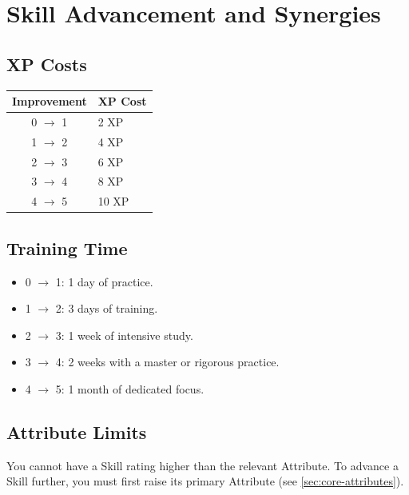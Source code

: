 \section{Skill Advancement and Synergies}
\label{sec:skill-advancement}

\subsection{XP Costs}
\begin{center}
\begin{tabular}{cl}
\toprule
\textbf{Improvement} & \textbf{XP Cost} \\
\midrule
0 $\rightarrow$ 1 & 2 XP \\
1 $\rightarrow$ 2 & 4 XP \\
2 $\rightarrow$ 3 & 6 XP \\
3 $\rightarrow$ 4 & 8 XP \\
4 $\rightarrow$ 5 & 10 XP \\
\bottomrule
\end{tabular}
\end{center}

\subsection{Training Time}
\label{sec:skill-training-time}
\begin{itemize}
  \item 0 $\rightarrow$ 1: 1 day of practice.
  \item 1 $\rightarrow$ 2: 3 days of training.
  \item 2 $\rightarrow$ 3: 1 week of intensive study.
  \item 3 $\rightarrow$ 4: 2 weeks with a master or rigorous practice.
  \item 4 $\rightarrow$ 5: 1 month of dedicated focus.
\end{itemize}

\subsection{Attribute Limits}
\label{sec:attribute-limits}
You cannot have a Skill rating higher than the relevant Attribute. To advance
a Skill further, you must first raise its primary Attribute (see \ref{sec:core-attributes}).

